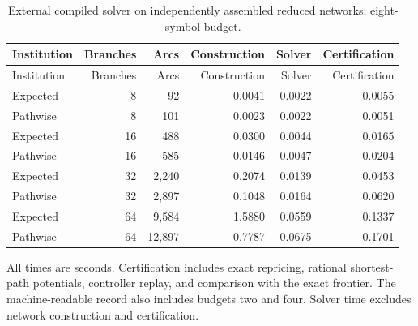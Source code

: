 \clearpage
\begin{longtable}{@{}lrrrrr@{}}
\caption{External compiled solver on independently assembled reduced networks; eight-symbol budget.}\label{tab:r37-solver}\\
\toprule
Institution & Branches & Arcs & Construction & Solver & Certification \\
\midrule
\endfirsthead
\toprule
Institution & Branches & Arcs & Construction & Solver & Certification \\
\midrule
\endhead
\bottomrule
\endfoot
Expected & 8 & 92 & 0.0041 & 0.0022 & 0.0055 \\
Pathwise & 8 & 101 & 0.0023 & 0.0022 & 0.0051 \\
Expected & 16 & 488 & 0.0300 & 0.0044 & 0.0165 \\
Pathwise & 16 & 585 & 0.0146 & 0.0047 & 0.0204 \\
Expected & 32 & 2,240 & 0.2074 & 0.0139 & 0.0453 \\
Pathwise & 32 & 2,897 & 0.1048 & 0.0164 & 0.0620 \\
Expected & 64 & 9,584 & 1.5880 & 0.0559 & 0.1337 \\
Pathwise & 64 & 12,897 & 0.7787 & 0.0675 & 0.1701 \\
\end{longtable}
\noindent All times are seconds. Certification includes exact repricing, rational shortest-path potentials, controller replay, and comparison with the exact frontier. The machine-readable record also includes budgets two and four. Solver time excludes network construction and certification.

